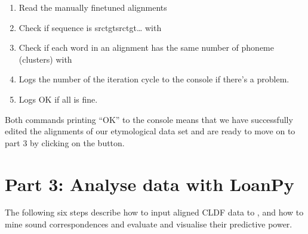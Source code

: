 \documentclass[letterpaper,10pt,english]{sphinxmanual}
\begin{document}
\begin{fulllineitems}
\label{\detokenize{mkedictor:ronataswestoldturkiccommands.evaledicted.run}}
\pysigstartsignatures
{}
\pysigstopsignatures\begin{enumerate}
%
\item {} 
\sphinxAtStartPar
Read the manually fine\sphinxhyphen{}tuned alignments

\item {} 
\sphinxAtStartPar
Check if sequence is src\sphinxhyphen{}tgt\sphinxhyphen{}src\sphinxhyphen{}tgt\sphinxhyphen{}…
with 

\item {} 
\sphinxAtStartPar
Check if each word in an alignment has the same number of
phoneme (clusters) with 

\item {} 
\sphinxAtStartPar
Logs the number of the iteration cycle to the console if there’s a
problem.

\item {} 
\sphinxAtStartPar
Logs OK if all is fine.

\end{enumerate}

\end{fulllineitems}


\sphinxAtStartPar
Both commands printing “OK” to the console means that we have successfully
edited the alignments of our etymological data set and are ready to move on
to part 3 by clicking on the  button.

\sphinxstepscope


\chapter{Part 3: Analyse data with LoanPy}
\label{\detokenize{mkloanpy:part-3-analyse-data-with-loanpy}}\label{\detokenize{mkloanpy::doc}}
\sphinxAtStartPar
The following six steps describe how to input aligned CLDF data to , and how to mine sound
correspondences and evaluate and visualise their predictive power.
\end{document}

